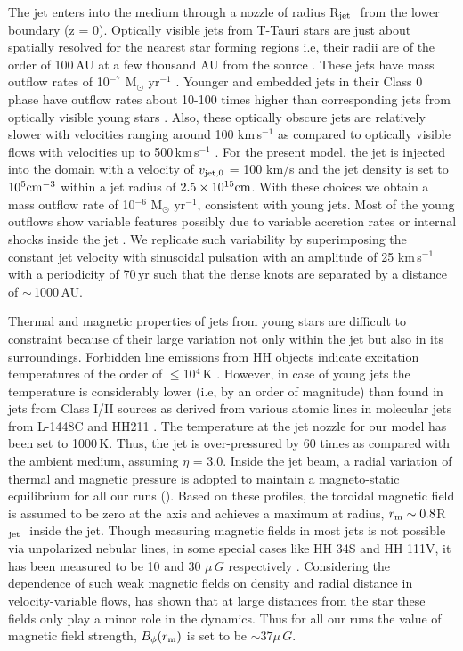 \documentclass[useAMS,usenatbib]{mn2e}
\newcommand{\rj}{R$_{\rm jet}$}
\begin{document}
The jet enters into the medium through a nozzle of radius \rj\,\,
from the lower boundary (z = 0). Optically visible jets from T-Tauri
stars are just about spatially resolved for the nearest
star forming regions i.e, their radii are of the order of
100\,AU at a few thousand AU from the source \citep{Ray:2012p15733}.
These jets have mass outflow rates of 10$^{-7}$ M$_{\odot}$
yr$^{-1}$ \citep{Dougados:2010p15774}. Younger and 
embedded jets in their Class 0 phase have
outflow rates about 10-100 times higher than 
corresponding jets from optically visible young stars
\citep{Bally:2007p2340, Dionatos:2009p15670, Ray:2012p15733}. Also,
these optically obscure jets are relatively slower with velocities
ranging around 100 km\,s$^{-1}$ \citep{Bally:2007p2340} as compared to
optically visible flows with velocities up to 500\,km\,s$^{-1}$
\citep[e.g,][]{Mundt:1987p15799}.
For the present model, the jet is injected into the domain with a 
velocity of $v_{\rm jet,0}$ = 100 km/s and the jet density is set to
$10^{5} \rm cm^{-3}$ within a jet radius of $2.5\times10^{15} \rm
cm$. With these choices we obtain a mass outflow rate of 10$^{-6}$
M$_{\odot}$ yr$^{-1}$, consistent with young jets. Most of the young outflows 
show variable features possibly due to variable accretion rates
or internal shocks inside the jet \citep[e.g.][]{Bachiller:1996p4692}.
We replicate such variability by superimposing the constant jet
velocity with sinusoidal pulsation with an amplitude of 25
km\,s$^{-1}$ with a periodicity of 70\,yr such that the dense knots
are separated by a distance of $\sim$\,1000\,AU.

Thermal and magnetic properties of jets from young stars are difficult
to constraint because of their large variation not only within the jet
but also in its surroundings. Forbidden line emissions from
HH objects indicate excitation temperatures of the order
of $\leq$10$^{4}$\,K \citep{Podio:2006p15921,
  Bally:2007p2340}. However, in case of 
young jets the temperature is
considerably lower (i.e, by an order of magnitude) than found in jets from Class I/II
sources as derived from various atomic lines in molecular jets from
L-1448C and HH211 \citep{Dionatos:2009p15670,Dionatos:2010p15968}.  
The temperature at the jet
nozzle for our model has been set to 1000\,K. Thus, the jet is
over-pressured by 60 times as compared with the ambient medium,
assuming $\eta$ = 3.0. Inside the jet beam, a radial variation of thermal
and magnetic pressure is adopted to maintain a magneto-static
equilibrium for all our runs (\citealt{Stone:2000p2650}). 
Based on these profiles, 
the toroidal magnetic field is assumed to be
zero at the axis and achieves a maximum at radius, $r_{\rm m} \sim 0.8$\rj\,\,
inside the jet. Though measuring magnetic fields in
most jets is not possible via unpolarized nebular lines, in some special
cases like HH 34S and HH 111V, it has been measured to be 10 and 30
$\mu\,G$ respectively \citep{Morse:1993p15960}. Considering the
dependence of such weak magnetic fields on density and radial distance in velocity-variable flows, 
\cite{Hartigan:2007p15768} has shown that at large distances from the 
star these fields only play a minor role in the dynamics. Thus for all
our runs the value of magnetic field strength, $B_{\phi}(r_{\rm m})$ 
is set to be $\sim 37\mu\,G$.
%
\end{document}
